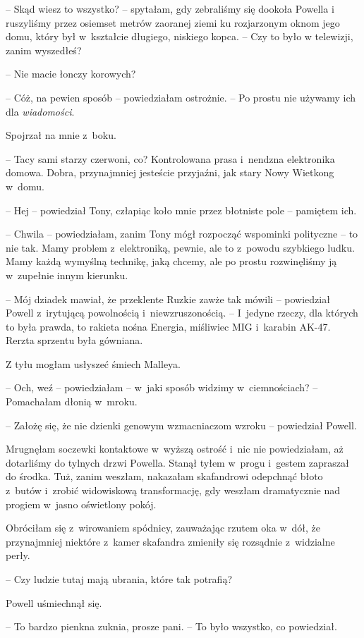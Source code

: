 \documentclass[oneside,polish,11pt,sfheadings]{mwbk}
\begin{document}
-- Skąd wiesz to wszystko? -- spytałam, gdy zebraliśmy się dookoła Powella
i ruszyliśmy przez osiemset metrów zaoranej ziemi ku rozjarzonym oknom
jego domu, który był w~kształcie długiego, niskiego kopca. -- Czy to było
w telewizji, zanim wyszedłeś?

-- Nie macie łonczy korowych?

-- Cóż, na pewien sposób -- powiedziałam ostrożnie. -- Po prostu nie
używamy ich dla \textit{wiadomości}.

Spojrzał na mnie z~boku. 

-- Tacy sami starzy czerwoni, co? Kontrolowana
prasa i~nendzna elektronika domowa. Dobra, przynajmniej jesteście
przyjaźni, jak stary Nowy Wietkong w~domu.

-- Hej -- powiedział Tony, człapiąc koło mnie przez błotniste pole -- pamiętem ich.

-- Chwila -- powiedziałam, zanim Tony mógł rozpocząć wspominki polityczne
-- to nie tak. Mamy problem z~elektroniką, pewnie, ale to z~powodu
szybkiego ludku. Mamy każdą wymyślną technikę, jaką chcemy, ale po
prostu rozwinęliśmy ją w~zupełnie innym kierunku.

-- Mój dziadek mawiał, że przeklente Ruzkie zawże tak mówili -- powiedział
Powell z~irytującą powolnością i~niewzruszonością. -- I~jedyne rzeczy,
dla których to była prawda, to rakieta nośna Energia, miśliwiec MIG i~karabin AK-47. Rerzta sprzentu była gówniana.

Z tyłu mogłam usłyszeć śmiech Malleya.

-- Och, weź -- powiedziałam -- w~jaki sposób widzimy w~ciemnościach? -- Pomachałam dłonią w~mroku.

-- Założę się, że nie dzienki genowym wzmacniaczom wzroku -- powiedział
Powell.

Mrugnęłam soczewki kontaktowe w~wyższą ostrość i~nic nie powiedziałam,
aż dotarliśmy do tylnych drzwi Powella. Stanął tyłem w~progu i~gestem
zapraszał do środka. Tuż, zanim weszłam, nakazałam skafandrowi odepchnąć
błoto z~butów i~zrobić widowiskową transformację, gdy weszłam
dramatycznie nad progiem w~jasno oświetlony pokój.

Obróciłam się z~wirowaniem spódnicy, zauważając rzutem oka w~dół, że
przynajmniej niektóre z~kamer skafandra zmieniły się rozsądnie z~widzialne perły. 

-- Czy ludzie tutaj mają ubrania, które tak potrafią?

Powell uśmiechnął się. 

-- To bardzo pienkna zuknia, prosze pani. -- To
było wszystko, co powiedział. 
\end{document}
